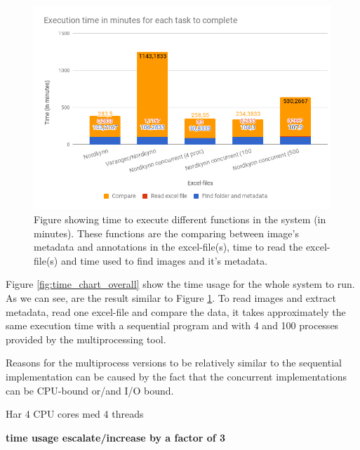 \documentclass[USenglish]{uit-thesis}
\begin{document}
\begin{figure} %
\centering
\includegraphics[width=\textwidth]{chart_done.png}
\caption{Figure showing time to execute different functions in the system (in minutes). These functions are the comparing between image's metadata and annotations in the excel-file(s), time to read the excel-file(s) and time used to find images and it's metadata.}
\label{fig:time_chart500}
\end{figure}


Figure \ref{fig:time_chart_overall} show the time usage for the whole system to run. As we can see, are the result similar to Figure \ref{fig:time_chart500}. To read images and extract metadata, read one excel-file and compare the data, it takes approximately the same execution time with a sequential program and with 4 and 100 processes provided by the multiprocessing tool.

Reasons for the multiprocess versions to be relatively similar to the sequential implementation can be caused by the fact that the concurrent implementations can be CPU-bound or/and I/O bound.

Har 4 CPU cores med 4 threads

\textbf{time usage escalate/increase by a factor of 3}
\end{document}
